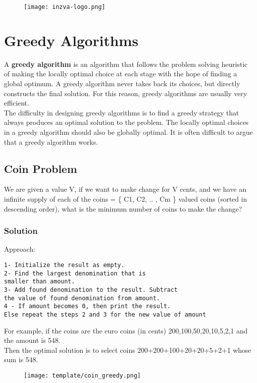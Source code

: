 \documentclass[12pt]{article}
\title{\vspace{-2em}\mytitle\vspace{-0.3em}}
\author{
	\textbf{Editor}\\
	Halil Çetiner  \\ \ \\ 
	\textbf{Reviewer(s)} \\ 
	Onur Yıldız
}
\date{}
\begin{document}
	
	\begin{figure}
		\centering
		\texttt{[image: inzva-logo.png]}
		\label{fig:inzva}
	\end{figure}
	\maketitle
	
	\cleardoublepage
	\tableofcontents
	\cleardoublepage
	\section{Greedy Algorithms}
	A \textbf{greedy algorithm} is an algorithm that follows the problem solving heuristic of making the locally optimal choice at each stage with the hope of finding a global optimum. A greedy algorithm never takes back its choices, but directly constructs the final solution. For this reason, greedy algorithms are usually very efficient.\\
    The difficulty in designing greedy algorithms is to find a greedy strategy that always produces an optimal solution to the problem. The locally optimal choices in a greedy algorithm should also be globally optimal. It is often difficult to argue that a greedy algorithm works.
	\subsection{Coin Problem}
	We are given a value V, if we want to make change for V cents, and we have an infinite supply of each of the coins = \{ C1, C2, .. , Cm \} valued coins (sorted in descending order), what is the minimum number of coins to make the change?
	\subsubsection{Solution}
    Approach:
	\begin{lstlisting}[numbers=none, frame=none]
1- Initialize the result as empty.
2- Find the largest denomination that is 
smaller than amount.
3- Add found denomination to the result. Subtract 
the value of found denomination from amount.
4 - If amount becomes 0, then print the result.  
Else repeat the steps 2 and 3 for the new value of amount
	\end{lstlisting}
	
	For example, if the coins are the euro coins (in cents) {200,100,50,20,10,5,2,1} and the amount is 548.\\
	Then the optimal solution is to select coins 200+200+100+20+20+5+2+1 whose sum is 548.
	\begin{figure}[h!]
        	\centering
        	\texttt{[image: template/coin\_greedy.png]}
        	\label{fig:coin_greedy}
        \end{figure}
	
\end{document}
